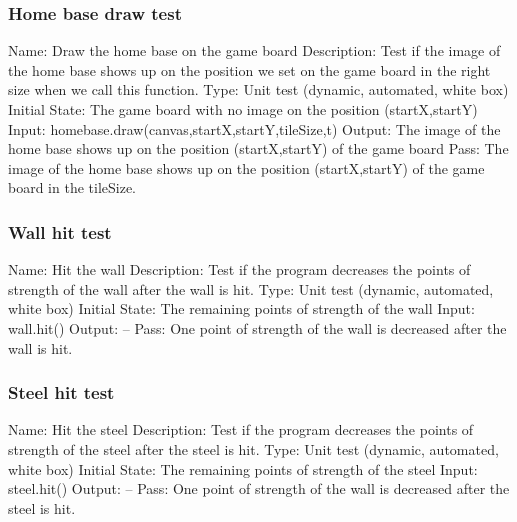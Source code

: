 \documentclass{article}
\begin{document}
\subsubsection{Home base draw test}
Name:  Draw the home base on the game board\newline
Description: Test if the image of the home base shows up on the position we set on the game board in the right size when we call this function. \newline
Type: Unit test (dynamic, automated, white box) \newline
Initial State:  The game board with no image on the position (startX,startY) \newline
Input: homebase.draw(canvas,startX,startY,tileSize,t)\newline
Output: The image of the home base shows up on the position (startX,startY) of the game board\newline
Pass:  The image of the home base shows up on the position (startX,startY) of the game board in the tileSize. \newline

\subsubsection{Wall hit test}
Name:  Hit the wall\newline
Description: Test if the program decreases the points of strength of the wall after the wall is hit. \newline
Type: Unit test (dynamic, automated, white box) \newline
Initial State:  The remaining points of strength of the wall\newline
Input: wall.hit()\newline
Output: --\newline
Pass:  One point of strength of the wall is decreased after the wall is hit. \newline

\subsubsection{Steel hit test}
Name:  Hit the steel\newline
Description: Test if the program decreases the points of strength of the steel after the steel is hit. \newline
Type: Unit test (dynamic, automated, white box) \newline
Initial State:  The remaining points of strength of the steel\newline
Input: steel.hit()\newline
Output: --\newline
Pass:  One point of strength of the wall is decreased after the steel is hit. \newline
\end{document}
